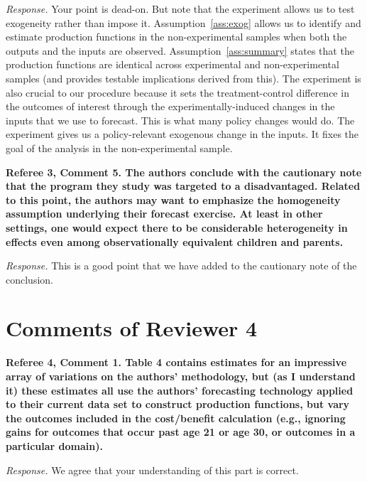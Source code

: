 \noindent \textit{Response.} Your point is dead-on. But note that the experiment allows us to test exogeneity rather than impose it. Assumption~\ref{ass:exog} allows us to identify and estimate production functions in the non-experimental samples when both the outputs and the inputs are observed. Assumption~\ref{ass:summary} states that the production functions are identical across experimental and non-experimental samples (and provides testable implications derived from this). The experiment is also crucial to our procedure because it sets the treatment-control difference in the outcomes of interest through the experimentally-induced changes in the inputs that we use to forecast. This is what many policy changes would do. The experiment gives us a policy-relevant exogenous change in the inputs. It fixes the goal of the analysis in the non-experimental sample.

\noindent \textbf{Referee 3, Comment 5. The authors conclude with the cautionary note that the program they study was targeted to a disadvantaged. Related to this point, the authors may want to emphasize the homogeneity assumption underlying their forecast exercise. At least in other settings, one would expect there to be considerable heterogeneity in effects even among observationally equivalent children and parents.}

\noindent \textit{Response.} This is a good point that we have added to the cautionary note of the conclusion.

\section*{Comments of Reviewer 4}

\noindent \textbf{Referee 4, Comment 1. Table 4 contains estimates for an impressive array of variations on the authors' methodology, but (as I understand it) these estimates all use the authors' forecasting technology applied to their current data set to construct production functions, but vary the outcomes included in the cost/benefit calculation (e.g., ignoring gains for outcomes that occur past age 21 or age 30, or outcomes in a particular domain).}

\noindent \textit{Response.} We agree that your understanding of this part is correct.
 
